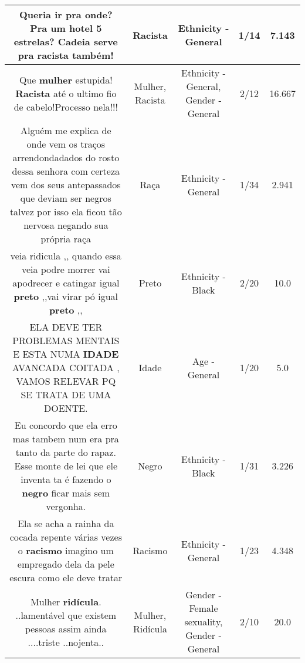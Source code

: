 \documentclass[11pt]{article}
\newlength\mylength
\begin{document}
\begin{center}
\begin{longtable}{|C{.65\mylength}|C{.30\mylength}|C{.12\mylength}|C{.12\mylength}|C{.12\mylength}|}
  \small Queria ir pra onde? Pra um hotel 5 estrelas? Cadeia serve pra \textbf{racista} também!\normalsize   & Racista & Ethnicity - General & 1/14 & 7.143 \\  \hline
  \small Que \textbf{mulher} estupida! \textbf{Racista} até o ultimo fio de cabelo!Processo nela!!!\normalsize   & Mulher, Racista & Ethnicity - General, Gender - General & 2/12 & 16.667 \\  \hline
  \small Alguém me explica de onde vem os traços arrendondadados do  rosto dessa senhora com certeza vem dos seus antepassados que deviam ser negros  talvez por isso ela ficou tão nervosa negando sua própria raça\normalsize   & Raça & Ethnicity - General & 1/34 & 2.941 \\  \hline
  \small veia ridicula ,, quando essa veia podre morrer vai apodrecer e catingar igual \textbf{preto} ,,vai virar pó igual \textbf{preto} ,,\normalsize   & Preto & Ethnicity - Black & 2/20 & 10.0 \\  \hline
  \small ELA DEVE TER PROBLEMAS MENTAIS E ESTA NUMA \textbf{IDADE} AVANCADA COITADA , VAMOS RELEVAR PQ SE TRATA DE UMA DOENTE.\normalsize   & Idade & Age - General & 1/20 & 5.0 \\  \hline
  \small Eu concordo que ela erro mas tambem num era pra tanto da parte do rapaz. Esse monte de lei que ele inventa ta é fazendo o \textbf{negro} ficar mais sem vergonha.\normalsize   & Negro & Ethnicity - Black & 1/31 & 3.226 \\  \hline
  \small Ela se acha a rainha da cocada repente várias vezes o \textbf{racismo} imagino um empregado dela da pele escura como ele deve tratar\normalsize   & Racismo & Ethnicity - General & 1/23 & 4.348 \\  \hline
  \small Mulher \textbf{ridícula}. ..lamentável que existem pessoas assim ainda ....triste ..nojenta..\normalsize   & Mulher, Ridícula & Gender - Female sexuality, Gender - General & 2/10 & 20.0 \\  \hline

\end{longtable}
\end{center}
\end{document}
